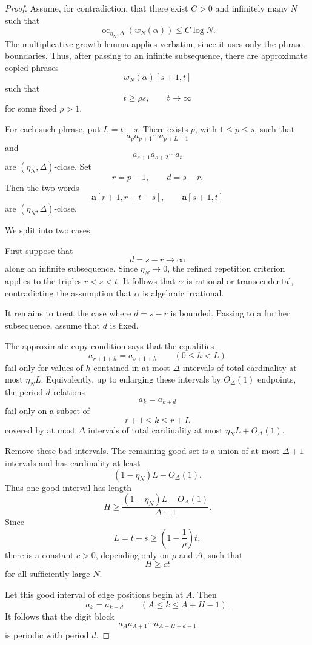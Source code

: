 \documentclass[11pt]{amsart}
\theoremstyle{definition}
\DeclareMathOperator{\oc}{oc}
\begin{document}
\begin{proof}
Assume, for contradiction, that there exist \(C>0\) and infinitely many \(N\) such that
\[
\oc_{\eta_N,\Delta}(w_N(\alpha))\leq C\log N.
\]
The multiplicative-growth lemma applies verbatim, since it uses only the phrase boundaries. Thus, after passing to an infinite subsequence, there are approximate copied phrases
\[
w_N(\alpha)[s+1,t]
\]
such that
\[
t\geq \rho s,
\qquad
t\to\infty
\]
for some fixed \(\rho>1\).

For each such phrase, put \(L=t-s\). There exists \(p\), with \(1\leq p\leq s\), such that
\[
a_p a_{p+1}\cdots a_{p+L-1}
\]
and
\[
a_{s+1}a_{s+2}\cdots a_t
\]
are \((\eta_N,\Delta)\)-close. Set
\[
r=p-1,
\qquad
d=s-r.
\]
Then the two words
\[
\mathbf a[r+1,r+t-s],
\qquad
\mathbf a[s+1,t]
\]
are \((\eta_N,\Delta)\)-close.

We split into two cases.

First suppose that
\[
d=s-r\to\infty
\]
along an infinite subsequence. Since \(\eta_N\to0\), the refined repetition criterion applies to the triples \(r<s<t\). It follows that \(\alpha\) is rational or transcendental, contradicting the assumption that \(\alpha\) is algebraic irrational.

It remains to treat the case where \(d=s-r\) is bounded. Passing to a further subsequence, assume that \(d\) is fixed.

The approximate copy condition says that the equalities
\[
a_{r+1+h}=a_{s+1+h}
\qquad(0\leq h<L)
\]
fail only for values of \(h\) contained in at most \(\Delta\) intervals of total cardinality at most \(\eta_N L\). Equivalently, up to enlarging these intervals by \(O_\Delta(1)\) endpoints, the period-\(d\) relations
\[
a_k=a_{k+d}
\]
fail only on a subset of
\[
r+1\leq k\leq r+L
\]
covered by at most \(\Delta\) intervals of total cardinality at most \(\eta_N L+O_\Delta(1)\).

Remove these bad intervals. The remaining good set is a union of at most \(\Delta+1\) intervals and has cardinality at least
\[
(1-\eta_N)L-O_\Delta(1).
\]
Thus one good interval has length
\[
H\geq \frac{(1-\eta_N)L-O_\Delta(1)}{\Delta+1}.
\]
Since
\[
L=t-s\geq \left(1-\frac1\rho\right)t,
\]
there is a constant \(c>0\), depending only on \(\rho\) and \(\Delta\), such that
\[
H\geq ct
\]
for all sufficiently large \(N\).

Let this good interval of edge positions begin at \(A\). Then
\[
a_k=a_{k+d}
\qquad(A\leq k\leq A+H-1).
\]
It follows that the digit block
\[
a_Aa_{A+1}\cdots a_{A+H+d-1}
\]
is periodic with period \(d\).


\end{proof}
\end{document}

